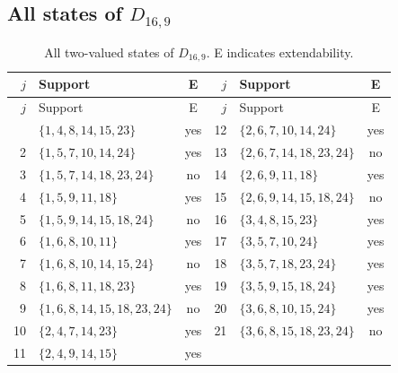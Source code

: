 \documentclass[aps,pra,reprint,superscriptaddress,longbibliography,nofootinbib,floatfix,10pt]{revtex4-2}
\theoremstyle{definition}
\begin{document}
\subsection{All states of \texorpdfstring{$D_{16,9}$}{gadget 3c}}
\begingroup\footnotesize\setlength{\tabcolsep}{3pt}\setlength{\LTpre}{5pt}\setlength{\LTpost}{8pt}
\begin{longtable}{rlc@{\qquad}rlc}
\caption{All two-valued states of $D_{16,9}$. E indicates extendability.}\label{tab:states-3c}\\\toprule $j$ & Support & E & $j$ & Support & E\\\midrule\endfirsthead
\toprule $j$ & Support & E & $j$ & Support & E\\\midrule\endhead\bottomrule\endfoot
1 & $\{1,\allowbreak 4,\allowbreak 8,\allowbreak 14,\allowbreak 15,\allowbreak 23\}$ & yes & 12 & $\{2,\allowbreak 6,\allowbreak 7,\allowbreak 10,\allowbreak 14,\allowbreak 24\}$ & yes\\
2 & $\{1,\allowbreak 5,\allowbreak 7,\allowbreak 10,\allowbreak 14,\allowbreak 24\}$ & yes & 13 & $\{2,\allowbreak 6,\allowbreak 7,\allowbreak 14,\allowbreak 18,\allowbreak 23,\allowbreak 24\}$ & no\\
3 & $\{1,\allowbreak 5,\allowbreak 7,\allowbreak 14,\allowbreak 18,\allowbreak 23,\allowbreak 24\}$ & no & 14 & $\{2,\allowbreak 6,\allowbreak 9,\allowbreak 11,\allowbreak 18\}$ & yes\\
4 & $\{1,\allowbreak 5,\allowbreak 9,\allowbreak 11,\allowbreak 18\}$ & yes & 15 & $\{2,\allowbreak 6,\allowbreak 9,\allowbreak 14,\allowbreak 15,\allowbreak 18,\allowbreak 24\}$ & no\\
5 & $\{1,\allowbreak 5,\allowbreak 9,\allowbreak 14,\allowbreak 15,\allowbreak 18,\allowbreak 24\}$ & no & 16 & $\{3,\allowbreak 4,\allowbreak 8,\allowbreak 15,\allowbreak 23\}$ & yes\\
6 & $\{1,\allowbreak 6,\allowbreak 8,\allowbreak 10,\allowbreak 11\}$ & yes & 17 & $\{3,\allowbreak 5,\allowbreak 7,\allowbreak 10,\allowbreak 24\}$ & yes\\
7 & $\{1,\allowbreak 6,\allowbreak 8,\allowbreak 10,\allowbreak 14,\allowbreak 15,\allowbreak 24\}$ & no & 18 & $\{3,\allowbreak 5,\allowbreak 7,\allowbreak 18,\allowbreak 23,\allowbreak 24\}$ & yes\\
8 & $\{1,\allowbreak 6,\allowbreak 8,\allowbreak 11,\allowbreak 18,\allowbreak 23\}$ & yes & 19 & $\{3,\allowbreak 5,\allowbreak 9,\allowbreak 15,\allowbreak 18,\allowbreak 24\}$ & yes\\
9 & $\{1,\allowbreak 6,\allowbreak 8,\allowbreak 14,\allowbreak 15,\allowbreak 18,\allowbreak 23,\allowbreak 24\}$ & no & 20 & $\{3,\allowbreak 6,\allowbreak 8,\allowbreak 10,\allowbreak 15,\allowbreak 24\}$ & yes\\
10 & $\{2,\allowbreak 4,\allowbreak 7,\allowbreak 14,\allowbreak 23\}$ & yes & 21 & $\{3,\allowbreak 6,\allowbreak 8,\allowbreak 15,\allowbreak 18,\allowbreak 23,\allowbreak 24\}$ & no\\
11 & $\{2,\allowbreak 4,\allowbreak 9,\allowbreak 14,\allowbreak 15\}$ & yes &  &  & \\
\end{longtable}\endgroup
\end{document}
